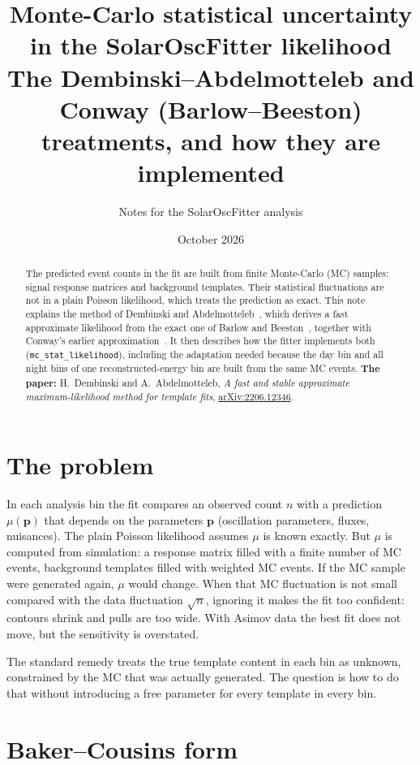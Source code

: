 \documentclass[11pt,a4paper]{article}
\title{Monte-Carlo statistical uncertainty in the SolarOscFitter likelihood\\[2pt]
\large The Dembinski--Abdelmotteleb and Conway (Barlow--Beeston) treatments, and how they are implemented}
\author{Notes for the SolarOscFitter analysis}
\date{October 2026}
\newcommand{\code}[1]{\texttt{#1}}
\begin{document}
\sloppy
\maketitle

\begin{abstract}
The predicted event counts in the fit are built from finite Monte-Carlo (MC) samples: signal
response matrices and background templates. Their statistical fluctuations are not in a plain
Poisson likelihood, which treats the prediction as exact. This note explains the method of
Dembinski and Abdelmotteleb~\cite{DA}, which derives a fast approximate likelihood from the
exact one of Barlow and Beeston~\cite{BB}, together with Conway's earlier
approximation~\cite{Conway}. It then describes how the fitter implements both
(\code{mc\_stat\_likelihood}), including the adaptation needed because the day bin and all night
bins of one reconstructed-energy bin are built from the same MC events.
\textbf{The paper:} H.~Dembinski and A.~Abdelmotteleb, \emph{A fast and stable approximate
maximum-likelihood method for template fits},
\href{https://arxiv.org/abs/2206.12346}{arXiv:2206.12346}.
\end{abstract}

\section{The problem}

In each analysis bin the fit compares an observed count $n$ with a prediction $\mu(\bm p)$ that
depends on the parameters $\bm p$ (oscillation parameters, fluxes, nuisances). The plain Poisson
likelihood assumes $\mu$ is known exactly. But $\mu$ is computed from simulation: a response
matrix filled with a finite number of MC events, background templates filled with weighted MC
events. If the MC sample were generated again, $\mu$ would change. When that MC fluctuation is
not small compared with the data fluctuation $\sqrt{n}$, ignoring it makes the fit too confident:
contours shrink and pulls are too wide. With Asimov data the best fit does not move, but the
sensitivity is overstated.

The standard remedy treats the true template content in each bin as unknown, constrained by the
MC that was actually generated. The question is how to do that without introducing a free
parameter for every template in every bin.

\section{Baker--Cousins form}
\end{document}
